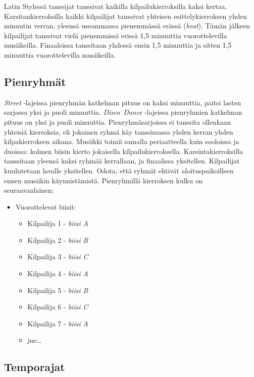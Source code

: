 \documentclass[12pt, a4paper, oneside]{article}
\begin{document}
Latin Stylessä tanssijat tanssivat kaikilla kilpailukierroksilla kaksi kertaa.
Karsitankierroksilla kaikki kilpailijat tanssivat yhteisen esittelykierroksen yhden minuutin verran,
yleensä useammassa pienemmässä erässä (\textit{heat}).
Tämän jälkeen kilpailijat tanssivat vielä pienemmissä erissä 1,5 minuuttia vuorottelevilla musiikeilla.
Finaaleissa tanssitaan yhdessä ensin 1,5 minuuttia ja sitten 1,5 minuuttia vuorottelevilla musiikeilla.

\subsection{Pienryhmät} \label{subsec:pienryhmat}

\textit{Street} -lajeissa pienryhmän katkelman pituus on kaksi minuuttia, paitsi lasten sarjassa yksi ja puoli minuuttia.
\textit{Disco~Dance} -lajeissa pienryhmien katkelman pituus on yksi ja puoli minuuttia.
Pienryhmäsarjoissa ei tanssita ollenkaan yhteisiä kierroksia,
eli jokainen ryhmä käy tanssimassa yhden kerran yhden kilpakierroksen aikana.
Musiikki toimii samalla periaatteella kuin sooloissa ja duoissa:
kolmen biisin kierto jokaisella kilpailukierroksella.
Karsintakierroksilla tanssitaan yleensä kaksi ryhmää kerrallaan,
ja finaalissa yksitellen.
Kilpailijat kuulutetaan lavalle yksitellen.
Odota, että ryhmät ehtivät aloituspaikoilleen ennen musiikin käynnistämistä.
Pienryhmillä kierroksen kulku on seuraavanlainen:

\begin{itemize}[nosep]
    \item Vuorottelevat biisit:
        \begin{itemize}
            \item Kilpailija 1 - \textit{biisi A}
            \item Kilpailija 2 - \textit{biisi B}
            \item Kilpailija 3 - \textit{biisi C}
            \item Kilpailija 4 - \textit{biisi A}
            \item Kilpailija 5 - \textit{biisi B}
            \item Kilpailija 6 - \textit{biisi C}
            \item Kilpailija 7 - \textit{biisi A}
            \item jne\ldots
        \end{itemize}
\end{itemize}

\subsection{Temporajat} \label{subsec:temporajat}
\end{document}
